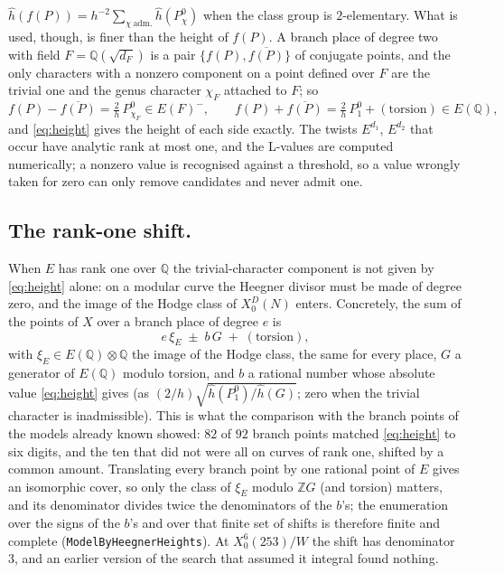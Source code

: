 \documentclass[11pt,reqno]{amsart}
\theoremstyle{plain}
\theoremstyle{definition}
\newcommand{\Q}{\mathbb{Q}}
\newcommand{\Z}{\mathbb{Z}}
\newcommand{\hh}{\hat h}
\begin{document}
$\hh(f(P))=h^{-2}\sum_{\chi\ \mathrm{adm.}}\hh(P^0_\chi)$ when the class group is $2$-elementary.
What is used, though, is finer than the height of $f(P)$. A branch place of degree two with field
$F=\Q(\sqrt{d_F})$ is a pair $\{f(P),\overline{f(P)}\}$ of conjugate points, and the only
characters with a nonzero component on a point defined over $F$ are the trivial one and the genus
character $\chi_F$ attached to $F$; so
\[
  f(P)-\overline{f(P)}=\tfrac{2}{h}\,P^0_{\chi_F}\in E(F)^-,\qquad
  f(P)+\overline{f(P)}=\tfrac{2}{h}\,P^0_{1}+(\text{torsion})\in E(\Q),
\]
and \eqref{eq:height} gives the height of each side exactly. The twists $E^{d_1}$, $E^{d_2}$ that
occur have analytic rank at most one, and the L-values are computed numerically; a nonzero value
is recognised against a threshold, so a value wrongly taken for zero can only remove candidates
and never admit one.

\subsection*{The rank-one shift.}
When $E$ has rank one over $\Q$ the trivial-character component is not given by
\eqref{eq:height} alone: on a modular curve the Heegner divisor must be made of degree zero, and
the image of the Hodge class of $X_0^D(N)$ enters. Concretely, the sum of the points of $X$ over a
branch place of degree $e$ is
\[
  e\,\xi_E\;\pm\;b\,G\;+\;(\text{torsion}),
\]
with $\xi_E\in E(\Q)\otimes\Q$ the image of the Hodge class, the same for every place, $G$ a
generator of $E(\Q)$ modulo torsion, and $b$ a rational number whose absolute value
\eqref{eq:height} gives (as $(2/h)\sqrt{\hh(P^0_1)/\hh(G)}$; zero when the trivial character is
inadmissible). This is what the comparison with the branch points of the models already known
showed: $82$ of $92$ branch points matched \eqref{eq:height} to six digits, and the ten that did
not were all on curves of rank one, shifted by a common amount. Translating every branch point by
one rational point of $E$ gives an isomorphic cover, so only the class of $\xi_E$ modulo $\Z G$
(and torsion) matters, and its denominator divides twice the denominators of the $b$'s; the
enumeration over the signs of the $b$'s and over that finite set of shifts is therefore finite and
complete (\texttt{ModelByHeegnerHeights}). At $X_0^6(253)/W$ the shift has denominator $3$, and an
earlier version of the search that assumed it integral found nothing.
\end{document}
